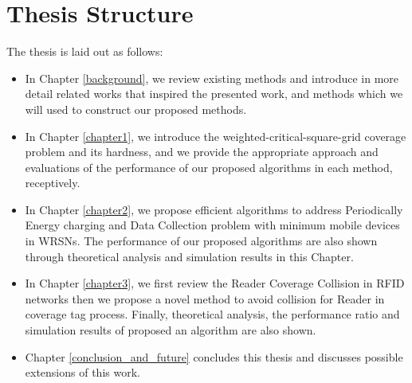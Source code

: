 \section{Thesis Structure}

The thesis is laid out as follows:

\begin{itemize}
  \item In Chapter \ref{background}, we review existing methods and introduce in more detail related works that
    inspired the presented work, and methods which we will used to construct our proposed methods.
  \item In Chapter \ref{chapter1}, we introduce the weighted-critical-square-grid
    coverage problem and its hardness, and we provide the appropriate approach and evaluations of the performance of our proposed algorithms in each method, receptively.
  \item In Chapter \ref{chapter2}, we propose efficient algorithms to address Periodically Energy charging and Data Collection problem with minimum mobile devices in WRSNs. The performance of our proposed algorithms are also shown through theoretical analysis and simulation results in this Chapter.
  \item In Chapter \ref{chapter3}, we first review the Reader Coverage Collision in RFID networks then we propose
    a novel method to avoid collision for Reader in coverage tag process. Finally, theoretical analysis, the performance ratio and simulation results of proposed an algorithm are also shown.
  \item Chapter \ref{conclusion_and_future} concludes this thesis and discusses possible extensions of this work.
\end{itemize}





